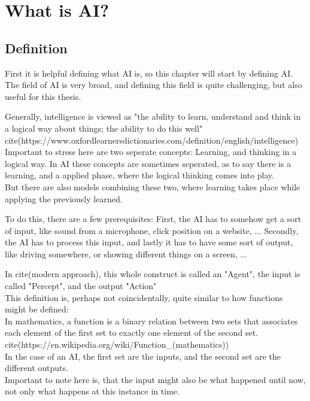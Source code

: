 \chapter{What is AI?}
\section{Definition}
First it is helpful defining what AI is, so this chapter will start by defining AI.
The field of AI is very broad, and defining this field is quite challenging, but also useful for this thesis. 

Generally, intelligence is viewed as "the ability to learn, understand and think in a logical way about things; the ability to do this well" cite(https://www.oxfordlearnersdictionaries.com/definition/english/intelligence)
Important to stress here are two seperate concepts: Learning, and thinking in a logical way.
In AI these concepts are sometimes seperated, as to say there is a learning, and a applied phase, where the logical thinking comes into play. \\But there are also models combining these two, where learning takes place while applying the previously learned.

To do this, there are a few prerequisites: 
First, the AI has to somehow get a sort of input, like sound from a microphone, click position on a website, ... 
Secondly, the AI has to process this input, 
and lastly it has to have some sort of output, like driving somewhere, or showing different things on a screen, ... 

In cite(modern approach), this whole construct is called an "Agent", the input is called "Percept", and the output "Action"\\This definition is, perhaps not coincidentally, quite similar to how functions might be defined: \\In mathematics, a function is a binary relation between two sets that associates each element of the first set to exactly one element of the second set. cite(https://en.wikipedia.org/wiki/Function_(mathematics)) \\In the case of an AI, the first set are the inputs, and the second set are the different outputs. \\Important to note here is, that the input might also be what happened until now, not only what happens at this instance in time.

